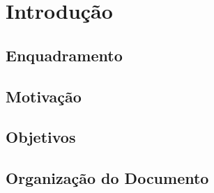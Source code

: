 \chapter{Introdução}
\label{ch::intro}

\section{Enquadramento}
\label{sec::intro:enquad}

\section{Motivação}
\label{sec::intro:motiv}

\section{Objetivos}
\label{sec::intro:objs}

\section{Organização do Documento}
\label{sec::intro:organiza}
